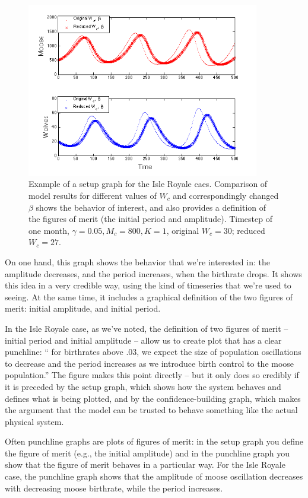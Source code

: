 \documentclass{tufte-handout}
\begin{document}
\begin{figure}[h!]
\includegraphics[width=4in]{figs/MooseBCTimeSeries}
\caption{Example of a setup graph for the Isle Royale caes.  Comparison of model results for different values of  $W_c$ and correspondingly changed 
$\beta$ shows the behavior of interest, and also provides a definition of the figures of merit (the initial period and amplitude).  Timestep of one month,  $\gamma = 0.05, M_c = 800, K=1$, original $W_c = 30$; reduced
$W_c = 27$.}
\end{figure}

On one hand, this graph shows the behavior that we're interested in:  the amplitude decreases, and the period increases, when the birthrate drops.  It shows this idea in a very credible way, using the kind of timeseries that we're used to seeing.  At the same time, it includes a graphical definition of the two figures of merit:  initial amplitude, and initial period.

  In the Isle Royale case, as we've noted, the definition of two figures of merit -- initial period and initial amplitude -- allow us to create plot that has a clear punchline:  `` for birthrates above .03, we expect the size of population oscillations to decrease and the period increases as we introduce birth control to the moose population.''  The figure makes this point directly -- but it only does so credibly if it is preceded by the setup graph, which shows how the system behaves and defines what is being plotted, and by the confidence-building graph, which makes the argument that the model can be trusted to behave something like the actual physical system.

Often punchline graphs are plots of figures of merit:  in the setup graph you define the figure of merit (e.g., the initial amplitude) and in the punchline graph you show that the figure of merit behaves in a particular way.  For the Isle Royale case, the punchline graph shows that the amplitude of moose oscillation decreases with decreasing moose birthrate, while the period increases.
\end{document}
